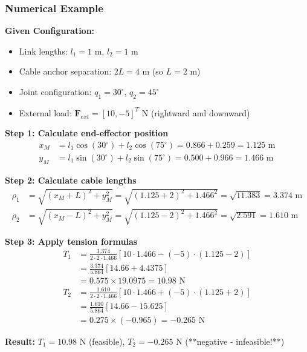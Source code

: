 \subsubsection{Numerical Example}

\textbf{Given Configuration:}
\begin{itemize}
    \item Link lengths: $l_1 = 1$ m, $l_2 = 1$ m
    \item Cable anchor separation: $2L = 4$ m (so $L = 2$ m)
    \item Joint configuration: $q_1 = 30^{\circ}$, $q_2 = 45^{\circ}$
    \item External load: $\bm{F}_{ext} = [10, -5]^T$ N (rightward and downward)
\end{itemize}

\textbf{Step 1: Calculate end-effector position}
\begin{align}
x_M &= l_1 \cos(30^{\circ}) + l_2 \cos(75^{\circ}) = 0.866 + 0.259 = 1.125 \text{ m} \\
y_M &= l_1 \sin(30^{\circ}) + l_2 \sin(75^{\circ}) = 0.500 + 0.966 = 1.466 \text{ m}
\end{align}

\textbf{Step 2: Calculate cable lengths}
\begin{align}
\rho_1 &= \sqrt{(x_M + L)^2 + y_M^2} = \sqrt{(1.125 + 2)^2 + 1.466^2} = \sqrt{11.383} = 3.374 \text{ m} \\
\rho_2 &= \sqrt{(x_M - L)^2 + y_M^2} = \sqrt{(1.125 - 2)^2 + 1.466^2} = \sqrt{2.591} = 1.610 \text{ m}
\end{align}

\textbf{Step 3: Apply tension formulas}
\begin{align}
T_1 &= \frac{3.374}{2 \cdot 2 \cdot 1.466} \left[ 10 \cdot 1.466 - (-5) \cdot (1.125 - 2) \right] \\
&= \frac{3.374}{5.864} \left[ 14.66 + 4.4375 \right] \\
&= 0.575 \times 19.0975 = 10.98 \text{ N} \\
T_2 &= \frac{1.610}{2 \cdot 2 \cdot 1.466} \left[ 10 \cdot 1.466 + (-5) \cdot (1.125 + 2) \right] \\
&= \frac{1.610}{5.864} \left[ 14.66 - 15.625 \right] \\
&= 0.275 \times (-0.965) = -0.265 \text{ N}
\end{align}

\textbf{Result:} $T_1 = 10.98$ N (feasible), $T_2 = -0.265$ N (**negative - infeasible!**)


